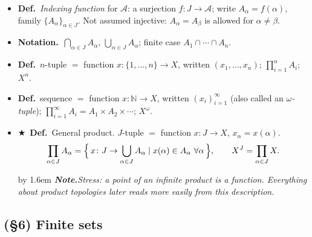 \documentclass[12pt,a4paper]{article}
\newcommand{\Dfn}{\textbf{Def.}~}
\newcommand{\Ntn}{\textbf{Notation.}~}
\newcommand{\Key}{$\bigstar$~}                  %
\newcommand{\Cue}[1]{%
  \par\addvspace{7pt}\nopagebreak
  \begingroup
    \advance\leftskip by 1.6em
    \parindent=0pt \small\color{cue}%
    \textbf{\textit{Note.}}\enspace \textit{#1}\par
  \endgroup
  \addvspace{9pt}}
\newenvironment{BL}%
  {\begin{itemize}[leftmargin=1.4em,labelsep=0.55em,itemsep=11pt,topsep=11pt,parsep=0pt]}%
  {\end{itemize}}
\newcommand{\NN}{\mathbb{N}}
\newcommand{\cA}{\mathcal{A}}
\begin{document}
\begin{BL}
\item \Dfn \emph{Indexing function} for $\cA$: a surjection $f\colon J\to\cA$;
      write $A_\alpha=f(\alpha)$, family $\{A_\alpha\}_{\alpha\in J}$.
      Not assumed injective: $A_\alpha=A_\beta$ is allowed for $\alpha\neq\beta$.
\item \Ntn $\bigcap_{\alpha\in J}A_\alpha$, $\bigcup_{\alpha\in J}A_\alpha$;
      finite case $A_1\cap\cdots\cap A_n$.
\item \Dfn $n$-tuple $=$ function $x\colon\{1,\dots,n\}\to X$, written $(x_1,\dots,x_n)$;
      \(\prod_{i=1}^{n}A_i\); \; $X^n$.
\item \Dfn sequence $=$ function $x\colon\NN\to X$, written $(x_i)_{i=1}^{\infty}$
      (also called an \emph{$\omega$-tuple});
      \;$\prod_{i=1}^{\infty}A_i=A_1\times A_2\times\cdots$;\; $X^\omega$.
\item \Key\Dfn General product. $J$-tuple $=$ function $x\colon J\to X$, $x_\alpha=x(\alpha)$.
  \[
    \prod_{\alpha\in J}A_\alpha
      =\Bigl\{\,x\colon J\to\bigcup_{\alpha\in J}A_\alpha \mid x(\alpha)\in A_\alpha\ \forall\alpha\,\Bigr\},
    \qquad X^J=\prod_{\alpha\in J}X .
  \]
\Cue{Stress: a point of an infinite product is a \emph{function}. Everything about product
topologies later reads more easily from this description.}
\end{BL}

\subsection{(\S6) Finite sets}
\end{document}
